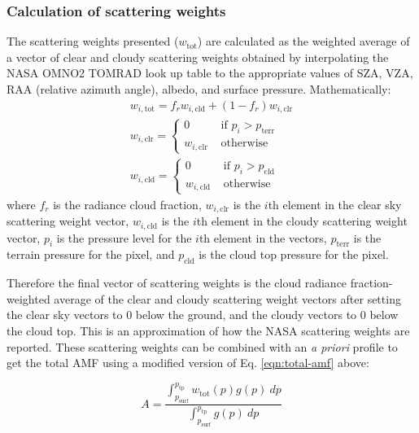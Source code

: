 \documentclass[12pt]{article}
\begin{document}
	\subsubsection{Calculation of scattering weights}\label{sec:scattering-wt-calc}
	The scattering weights presented ($w_{\mathrm{tot}}$) are calculated as the weighted average of a vector of clear and cloudy scattering weights obtained by interpolating the NASA OMNO2 TOMRAD look up table to the appropriate values of SZA, VZA, RAA (relative azimuth angle), albedo, and surface pressure. Mathematically:
	\begin{align}
		w_{i, \mathrm{tot}} = f_r w_{i, \mathrm{cld}} + (1 - f_r) w_{i, \mathrm{clr}} \label{eqn-pubSW}\\
		w_{i, \mathrm{clr}} = \left\lbrace 
			\begin{matrix}
				0 & \text{ if } p_i > p_\mathrm{terr} \\
				w_{i, \mathrm{clr}} & \text{ otherwise }
			\end{matrix}\right. \\
		w_{i, \mathrm{cld}} = \left\lbrace 
			\begin{matrix} 
				0 & \text{ if } p_i > p_\mathrm{cld} \\
				w_{i, \mathrm{cld}} & \text{ otherwise }
			\end{matrix}\right. \label{eqn-cldSW}
	\end{align}
	where $f_r$ is the radiance cloud fraction, $w_{i, \mathrm{clr}}$ is the $i$th element in the clear sky scattering weight vector, $w_{i, \mathrm{cld}}$ is the $i$th element in the cloudy scattering weight vector, $p_i$ is the pressure level for the $i$th element in the vectors, $p_\mathrm{terr}$ is the terrain pressure for the pixel, and $p_\mathrm{cld}$ is the cloud top pressure for the pixel.
	
	Therefore the final vector of scattering weights is the cloud radiance fraction-weighted average of the clear and cloudy scattering weight vectors after setting the clear sky vectors to 0 below the ground, and the cloudy vectors to 0 below the cloud top.  This is an approximation of how the NASA scattering weights are reported.  These scattering weights can be combined with an \emph{a priori}  profile to get the total AMF using a modified version of Eq. \eqref{eqn:total-amf} above:
	
	\begin{equation}\label{eqn:amf-published-sw}
	A = \frac{\int_{p_{\mathrm{surf}}}^{p_{\mathrm{tp}}} w_{\mathrm{tot}}(p) g(p) \: dp}{\int_{p_{\mathrm{surf}}}^{p_{\mathrm{tp}}} g(p) \: dp}
	\end{equation}
	
\end{document}
